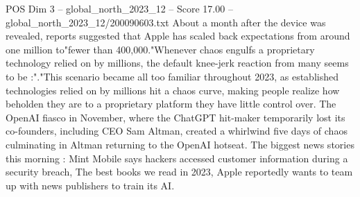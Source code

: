 \begin{textsample}{POS Dim 3 – global\_north\_2023\_12 – Score 17.00 – global\_north\_2023\_12/200090603.txt}
About a month after the device was revealed, reports suggested that Apple has scaled back expectations from around one million to"fewer than 400,000."Whenever chaos engulfs a proprietary technology relied on by millions, the default knee-jerk reaction from many seems to be :"."This scenario became all too familiar throughout 2023, as established technologies relied on by millions hit a chaos curve, making people realize how beholden they are to a proprietary platform they have little control over.
The OpenAI fiasco in November, where the ChatGPT hit-maker temporarily lost its co-founders, including CEO Sam Altman, created a whirlwind five days of chaos culminating in Altman returning to the OpenAI hotseat.
The biggest news stories this morning : Mint Mobile says hackers accessed customer information during a security breach, The best books we read in 2023, Apple reportedly wants to team up with news publishers to train its AI.

\end{textsample}

